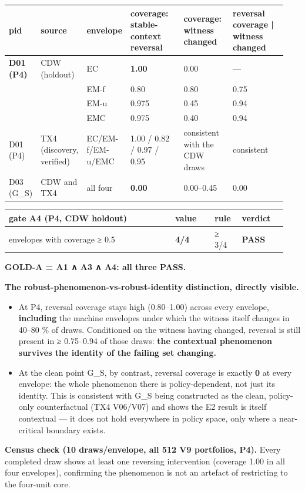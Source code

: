\documentclass[10pt,a4paper]{article}
\begin{document}
{\small
\begin{longtable}{L{0.075\linewidth}L{0.157\linewidth}L{0.100\linewidth}L{0.207\linewidth}L{0.182\linewidth}L{0.219\linewidth}}
\toprule
\textbf{pid} & \textbf{source} & \textbf{envelope} & \textbf{coverage: stable-context reversal} & \textbf{coverage: witness changed} & \textbf{reversal coverage | witness changed} \\
\midrule
\endhead
\textbf{D01 (P4)} & CDW (holdout) & EC & \textbf{1.00} & 0.00 & — \\
 &  & EM-f & 0.80 & 0.80 & 0.75 \\
 &  & EM-u & 0.975 & 0.45 & 0.94 \\
 &  & EMC & 0.975 & 0.40 & 0.94 \\
D01 (P4) & TX4 (discovery, verified) & EC/EM-f/EM-u/EMC & 1.00 / 0.82 / 0.97 / 0.95 & consistent with the CDW draws & consistent \\
D03 (G\_S) & CDW and TX4 & all four & \textbf{0.00} & 0.00–0.45 & 0.00 \\
\bottomrule
\end{longtable}}
{\small
\begin{longtable}{L{0.556\linewidth}L{0.134\linewidth}L{0.096\linewidth}L{0.153\linewidth}}
\toprule
\textbf{gate A4 (P4, CDW holdout)} & \textbf{value} & \textbf{rule} & \textbf{verdict} \\
\midrule
\endhead
envelopes with coverage ≥ 0.5 & \textbf{4/4} & ≥ 3/4 & \textbf{PASS} \\
\bottomrule
\end{longtable}}
\textbf{GOLD-A = A1 ∧ A3 ∧ A4: all three PASS.}

\textbf{The robust-phenomenon-vs-robust-identity distinction, directly visible.}

\begin{itemize}
\item At P4, reversal coverage stays high (0.80–1.00) across every envelope, \textbf{including} the machine envelopes under which the witness itself changes in 40–80 \% of draws. Conditioned on the witness having changed, reversal is still present in ≥ 0.75–0.94 of those draws: \textbf{the contextual phenomenon survives the identity of the failing set changing.}
\item At the clean point G\_S, by contrast, reversal coverage is exactly \textbf{0} at every envelope: the whole phenomenon there is policy-dependent, not just its identity. This is consistent with G\_S being constructed as the clean, policy-only counterfactual (TX4 V06/V07) and shows the E2 result is itself contextual — it does not hold everywhere in policy space, only where a near-critical boundary exists.
\end{itemize}
\textbf{Census check (10 draws/envelope, all 512 V9 portfolios, P4).} Every completed draw shows at least one reversing intervention (coverage 1.00 in all four envelopes), confirming the phenomenon is not an artefact of restricting to the four-unit core.
\end{document}
